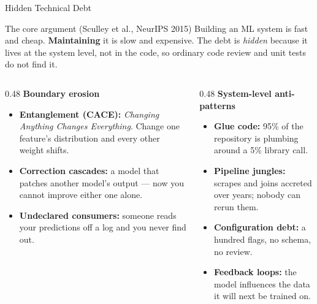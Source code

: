 
\begin{frame}{Hidden Technical Debt}

    \begin{block}{The core argument (Sculley et al., NeurIPS 2015)}
        Building an ML system is fast and cheap. \textbf{Maintaining} it is slow and expensive.
        The debt is \emph{hidden} because it lives at the system level, not in the code, so ordinary
        code review and unit tests do not find it.
    \end{block}

    \vspace{0.5em}
    \begin{columns}[T]
        \begin{column}{0.48\textwidth}
            \small
            \textbf{Boundary erosion}
            \begin{itemize}
                \item \textbf{Entanglement (CACE):} \textit{Changing Anything Changes Everything}. Change one
                      feature's distribution and every other weight shifts.
                \item \textbf{Correction cascades:} a model that patches another model's output --- now you cannot
                      improve either one alone.
                \item \textbf{Undeclared consumers:} someone reads your predictions off a log and you never find out.
            \end{itemize}
        \end{column}
        \begin{column}{0.48\textwidth}
            \small
            \textbf{System-level anti-patterns}
            \begin{itemize}
                \item \textbf{Glue code:} 95\% of the repository is plumbing around a 5\% library call.
                \item \textbf{Pipeline jungles:} scrapes and joins accreted over years; nobody can rerun them.
                \item \textbf{Configuration debt:} a hundred flags, no schema, no review.
                \item \textbf{Feedback loops:} the model influences the data it will next be trained on.
            \end{itemize}
        \end{column}
    \end{columns}

\end{frame}

